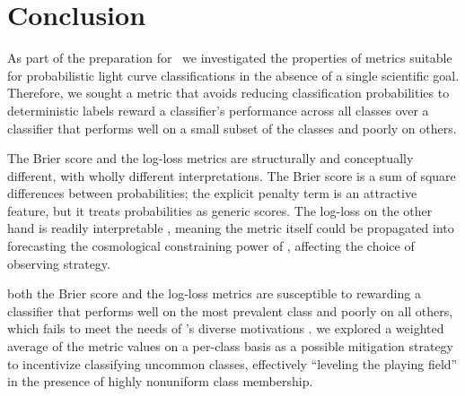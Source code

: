 \section{Conclusion}
\label{sec:conclusion}

As part of the preparation for \plasticc\, we investigated the properties of metrics suitable for probabilistic light curve classifications in the absence of a single scientific goal.
Therefore, we sought a metric that avoids reducing classification probabilities to deterministic labels  reward a classifier's performance across all classes over a classifier that performs well on a small subset of the classes and poorly on others.

The Brier score and the log-loss metrics are structurally and conceptually different, with wholly different interpretations.
The Brier score is a sum of square differences between probabilities;
the explicit penalty term is an attractive feature, but it treats probabilities as generic scores.
The log-loss on the other hand is readily interpretable , meaning the metric itself could be propagated into forecasting the cosmological constraining power of \lsst, affecting the choice of observing strategy.

 both the Brier score and the log-loss metrics are susceptible to rewarding a classifier that performs well on the most prevalent class and poorly on all others, which fails to meet the needs of \plasticc's diverse motivations .
 we explored a weighted average of the metric values on a per-class basis as a possible mitigation strategy to incentivize classifying uncommon classes, effectively ``leveling the playing field'' in the presence of highly nonuniform class membership.

